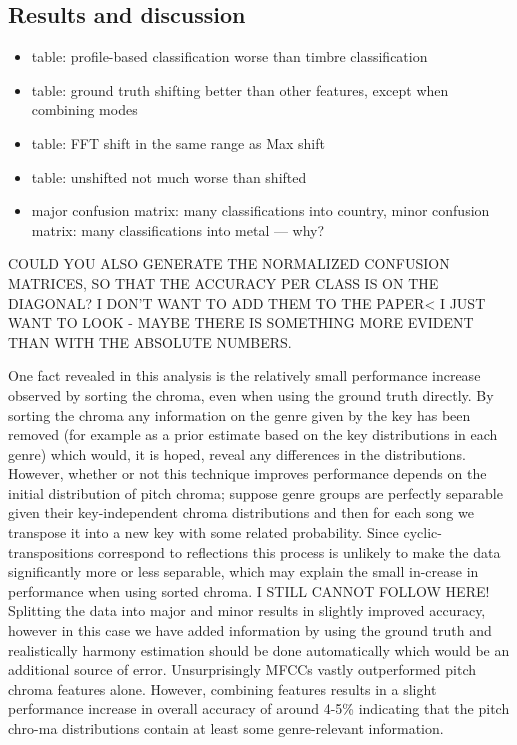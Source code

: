 \documentclass{article}
\begin{document}
\subsection{Results and discussion}
\begin{itemize}
    \item   table: profile-based classification worse than timbre classification
    \item   table: ground truth shifting better than other features, except when combining modes
    \item   table: FFT shift in the same range as Max shift
    \item   table: unshifted not much worse than shifted
    \item   major confusion matrix: many classifications into country, minor confusion matrix: many classifications into  metal --- why?
\end{itemize}
COULD YOU ALSO GENERATE THE NORMALIZED CONFUSION MATRICES, SO THAT THE ACCURACY PER CLASS IS ON THE DIAGONAL? I DON'T WANT TO ADD THEM TO THE PAPER< I JUST WANT TO LOOK - MAYBE THERE IS SOMETHING MORE EVIDENT THAN WITH THE ABSOLUTE NUMBERS.

One fact revealed in this analysis is the relatively small performance increase observed by sorting the chroma, even when using the ground truth directly. By sorting the chroma any information on the genre given by the key has been removed (for example as a prior estimate based on the key distributions in each genre) which would, it is hoped, reveal any differences in the distributions. 
However, whether or not this technique improves performance depends on the initial distribution of pitch chroma; suppose genre groups are perfectly separable given their key-independent chroma distributions and then for each song we transpose it into a new key with some related probability. Since cyclic-transpositions correspond to reflections this process is unlikely to make the data significantly more or less separable, which may explain the small in-crease in performance when using sorted chroma. I STILL CANNOT FOLLOW HERE!
Splitting the data into major and minor results in slightly improved accuracy, however in this case we have added information by using the ground truth and realistically harmony estimation should be done automatically which would be an additional source of error.
	Unsurprisingly MFCCs vastly outperformed pitch chroma features alone. However, combining features results in a slight performance increase in overall accuracy of around 4-5\% indicating that the pitch chro-ma distributions contain at least some genre-relevant information.
    
\end{document}
